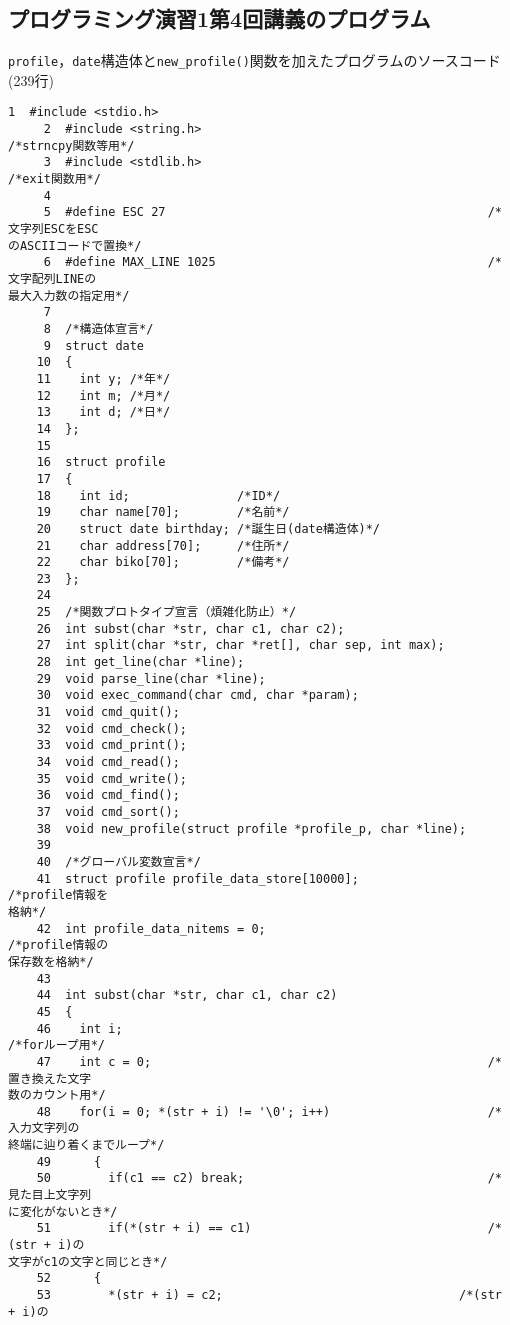 \subsection{プログラミング演習1第4回講義のプログラム}\label{func4}
\verb|profile|，\verb|date|構造体と\verb|new_profile()|関数を加えたプログラムのソースコード(239行)
\begin{Verbatim}[fontsize=\small, baselinestretch=0.8]
     1	#include <stdio.h>
     2	#include <string.h>                                        /*strncpy関数等用*/
     3	#include <stdlib.h>                                        /*exit関数用*/
     4	
     5	#define ESC 27                                             /*文字列ESCをESC
のASCIIコードで置換*/
     6	#define MAX_LINE 1025                                      /*文字配列LINEの
最大入力数の指定用*/
     7	
     8	/*構造体宣言*/
     9	struct date
    10	{
    11	  int y; /*年*/
    12	  int m; /*月*/
    13	  int d; /*日*/
    14	};
    15	
    16	struct profile
    17	{
    18	  int id;               /*ID*/
    19	  char name[70];        /*名前*/
    20	  struct date birthday; /*誕生日(date構造体)*/
    21	  char address[70];     /*住所*/
    22	  char biko[70];        /*備考*/
    23	};
    24	
    25	/*関数プロトタイプ宣言（煩雑化防止）*/
    26	int subst(char *str, char c1, char c2);
    27	int split(char *str, char *ret[], char sep, int max);
    28	int get_line(char *line);
    29	void parse_line(char *line);
    30	void exec_command(char cmd, char *param);
    31	void cmd_quit();
    32	void cmd_check();
    33	void cmd_print();
    34	void cmd_read();
    35	void cmd_write();
    36	void cmd_find();
    37	void cmd_sort();
    38	void new_profile(struct profile *profile_p, char *line);
    39	
    40	/*グローバル変数宣言*/
    41	struct profile profile_data_store[10000];                  /*profile情報を
格納*/
    42	int profile_data_nitems = 0;                               /*profile情報の
保存数を格納*/
    43	
    44	int subst(char *str, char c1, char c2)
    45	{
    46	  int i;                                                   /*forループ用*/
    47	  int c = 0;                                               /*置き換えた文字
数のカウント用*/
    48	  for(i = 0; *(str + i) != '\0'; i++)                      /*入力文字列の
終端に辿り着くまでループ*/
    49	    {
    50	      if(c1 == c2) break;                                  /*見た目上文字列
に変化がないとき*/
    51	      if(*(str + i) == c1)                                 /*(str + i)の
文字がc1の文字と同じとき*/
    52		{
    53		  *(str + i) = c2;                                 /*(str + i)の

\end{Verbatim}

